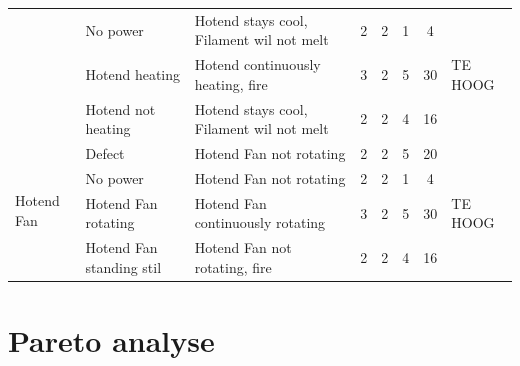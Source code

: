 \documentclass{article}
\begin{document}
\begin{landscape}
\begin{longtable}{|l|l|l|c|c|c|c|l|}
                                            & No power                  & Hotend stays cool, Filament wil not melt          & 2 & 2 & 1 &  4 & \\
                                            & Hotend heating            & Hotend continuously heating, fire                 & 3 & 2 & 5 & 30 & TE HOOG \\
                                            & Hotend not heating        & Hotend stays cool, Filament wil not melt          & 2 & 2 & 4 & 16 & \\ 
                                            \hline
        \multirow{4}{*}{Hotend Fan}         & Defect                    & Hotend Fan not rotating                           & 2 & 2 & 5 & 20 & \\
                                            & No power                  & Hotend Fan not rotating                           & 2 & 2 & 1 &  4 & \\
                                            & Hotend Fan rotating       & Hotend Fan continuously rotating                  & 3 & 2 & 5 & 30 & TE HOOG \\
                                            & Hotend Fan standing stil  & Hotend Fan not rotating, fire                     & 2 & 2 & 4 & 16 & \\ 
                                            \hline   
    \end{longtable}
\end{landscape}


\newpage
\section{Pareto analyse}


\newpage
% 
% 


\end{document}
